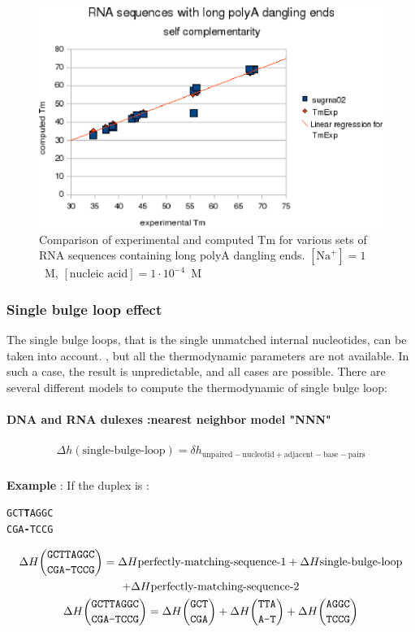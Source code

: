 \documentclass{article}
\begin{document}
\begin{figure}[h]
\includegraphics{images/RNALongDanglingEnd.eps}
\caption{Comparison of experimental and computed Tm for various sets of
 RNA sequences containing long polyA dangling ends. $[\mbox{Na}^+] = 1$~M, $[\mbox{nucleic acid}] = 1\cdot{}10^{-4}$~M}
\end{figure}

\subsubsection{Single bulge loop effect}

The single bulge loops, that is the single unmatched internal nucleotides, can be taken into
account. , but all the thermodynamic parameters are not available. In such a case, 
the result is unpredictable, and all cases are possible. 
There are several different models to compute the thermodynamic of single bulge loop:

\paragraph{DNA and RNA dulexes :\textbf{nearest neighbor model "NNN"}} 

\begin{multline*}
\Delta h {(\mbox{single-bulge-loop})} =
\delta{}h_\mathrm{unpaired-nucleotid+adjacent-base-pairs} \\
\end{multline*}

\textbf{Example} :
If the duplex is :
\begin{alltt}
GCT\textbf{T}AGGC
CGA\textbf{-}TCCG
\end{alltt}
\begin{multline*}
\Delta H {\mbox{\texttt{GCTTAGGC}} \choose \mbox{\texttt{CGA-TCCG}}} =
\Delta H {\mbox{perfectly-matching-sequence-1}} +
\Delta H {\mbox{single-bulge-loop}} \\ +
\Delta H {\mbox{perfectly-matching-sequence-2}}\\
\Delta H {\mbox{\texttt{GCTTAGGC}} \choose \mbox{\texttt{CGA-TCCG}}} =
\Delta H {\mbox{\texttt{GCT}} \choose \mbox{\texttt{CGA}}} +
\Delta H {\mbox{\texttt{TTA}} \choose \mbox{\texttt{A-T}}} +
\Delta H {\mbox{\texttt{AGGC}} \choose \mbox{\texttt{TCCG}}}\\
\end{multline*}
\end{document}
